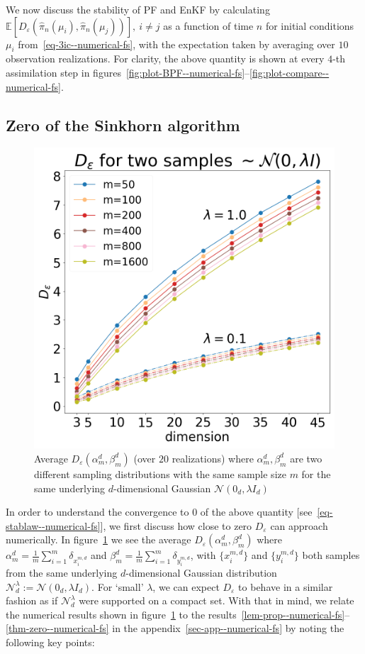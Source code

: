 
We now discuss the stability of PF and EnKF by calculating $\mathbb E[D_\varepsilon(\hat\pi_n(\mu_i), \hat\pi_n(\mu_j))], \ i \ne j$ as a function of time $n$ for initial conditions $\mu_i$ from~\eqref{eq-3ic--numerical-fs}, with the expectation taken by
averaging over $10$ observation realizations. For clarity, the above quantity is shown at every $4$-th assimilation step in figures~\ref{fig:plot-BPF--numerical-fs}--\ref{fig:plot-compare--numerical-fs}.

\subsection{Zero of the Sinkhorn algorithm}
\begin{figure}
\centering
\includegraphics[width=0.8\columnwidth]{stability/plots/figures-EnKF-zeros_cov=0.1_cov=1.0.png}
\caption{Average $D_{\varepsilon}(\alpha_m^d, \beta_m^d)$ (over $20$ realizations) where $\alpha_m^d, \beta_m^d$ are two different sampling distributions with the same sample size $m$ for the same underlying $d$-dimensional Gaussian $\mathcal N(0_d, \lambda I_d)$}
\label{fig:plot-zeros--numerical-fs}
\end{figure}
In order to understand the convergence to $0$ of the above quantity [see~\eqref{eq-stablaw--numerical-fs}], we first discuss how close to zero $D_\varepsilon$ can approach numerically. In figure~\ref{fig:plot-zeros--numerical-fs} we see the average $D_\varepsilon(\alpha^d_m, \beta^d_m)$ where $\alpha_m^d=\frac{1}{m}\sum_{i=1}^m\delta_{x^{m,d}_i}$ and $\beta_m^d=\frac{1}{m}\sum_{i=1}^m\delta_{y^{m,d}_i}$, with $\{x^{m,d}_i\}$ and $\{y^{m,d}_i\}$ both samples from the same underlying $d$-dimensional Gaussian distribution $\mathcal N_d^\lambda:=\mathcal N(0_d, \lambda I_d)$. 
For `small' $\lambda$, we can expect $D_\varepsilon$ to behave in a similar fashion as if $\mathcal N_d^\lambda$ were supported on a compact set. With that in mind, we relate the numerical results shown in figure~\ref{fig:plot-zeros--numerical-fs} to the results~\ref{lem-prop--numerical-fs}--\ref{thm-zero--numerical-fs} in the appendix~\ref{sec-app--numerical-fs} by noting the following key points:

